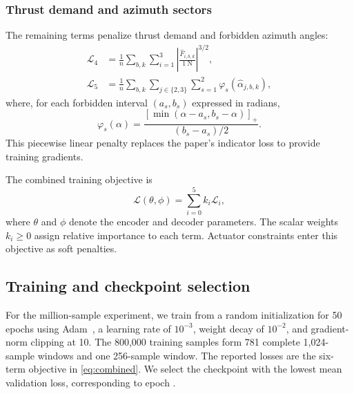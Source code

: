 \documentclass[conference]{IEEEtran}
\newcommand{\pos}[1]{\left[#1\right]_{+}}
\begin{document}
\subsubsection{Thrust demand and azimuth sectors}
The remaining terms penalize thrust demand and forbidden azimuth angles:
\begin{align}
 \mathcal L_4&=\frac{1}{n}\sum_{b,k}\sum_{i=1}^{3}
       \left|\frac{\hat F_{i,b,k}}{1~\mathrm N}\right|^{3/2},
 \label{eq:L4}\\
 \mathcal L_5&=\frac{1}{n}\sum_{b,k}\sum_{j\in\{2,3\}}\sum_{s=1}^{2}
       \varphi_s(\hat\alpha_{j,b,k}),
 \label{eq:L5}
\end{align}
where, for each forbidden interval $(a_s,b_s)$ expressed in radians,
\begin{equation}
 \varphi_s(\alpha)=
 \frac{\pos{\min(\alpha-a_s,b_s-\alpha)}}{(b_s-a_s)/2}.
\end{equation}
This piecewise linear penalty replaces the paper's indicator loss to
provide training gradients.

The combined training objective is
\begin{equation}
 \mathcal L(\theta,\phi)=\sum_{i=0}^{5}k_i\mathcal L_i,
 \label{eq:combined}
\end{equation}
where $\theta$ and $\phi$ denote the encoder and decoder parameters.
The scalar weights $k_i\geq0$ assign relative importance to each term.
Actuator constraints enter this objective as soft penalties.

\subsection{Training and checkpoint selection}
For the million-sample experiment, we train from a random initialization
for 50 epochs using Adam~\cite{Kingma2015}, a learning rate of $10^{-3}$,
weight decay of $10^{-2}$, and gradient-norm clipping at 10.
The 800,000 training samples form 781 complete 1,024-sample windows and
one 256-sample window. The reported losses are the six-term objective
in \eqref{eq:combined}. We select the checkpoint with the lowest mean
validation loss, corresponding to epoch \SelectedEpoch.
\end{document}
